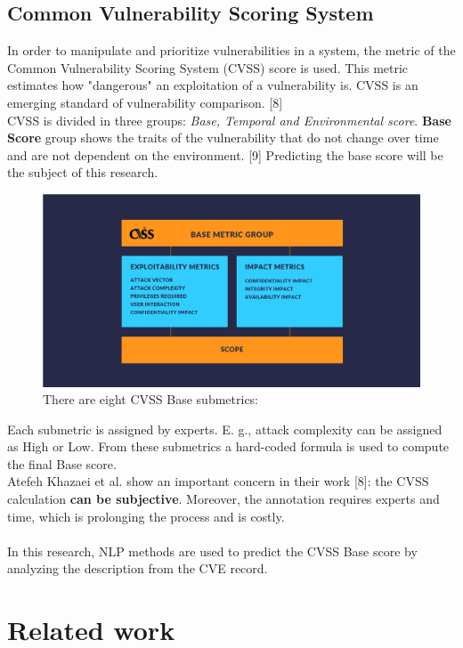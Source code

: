 \documentclass[times, utf8, zavrsni, english]{fer}
\begin{document}
\section{Common Vulnerability Scoring System}
In order to manipulate and prioritize vulnerabilities in a system, the metric of the Common Vulnerability Scoring System (CVSS) score is used. This metric estimates how "dangerous" an exploitation of a vulnerability is. CVSS is an emerging standard of vulnerability comparison. [8] \\
CVSS is divided in three groups: \emph{Base, Temporal and Environmental score}. 
\textbf{Base Score} group shows the traits of the vulnerability that do not change over time and are not dependent on the environment. [9] Predicting the base score will be the subject of this research. \\

\begin{figure}[h]
	\caption{There are eight CVSS Base submetrics:}
	\centering
	\includegraphics[scale=0.25]{CVSS-Base-Metric-Group}
\end{figure}
Each submetric is assigned by experts. E. g., attack complexity can be assigned as High or Low. From these submetrics a hard-coded formula is used to compute the final Base score. \\
Atefeh Khazaei et al. show an important concern in their work [8]: the CVSS calculation \textbf{can be subjective}.
Moreover, the annotation requires experts and time, which is prolonging the process and is costly. \\
\\

In this research, NLP methods are used to predict the CVSS Base score by analyzing the description from the CVE record.

\chapter{Related work}
\end{document}

